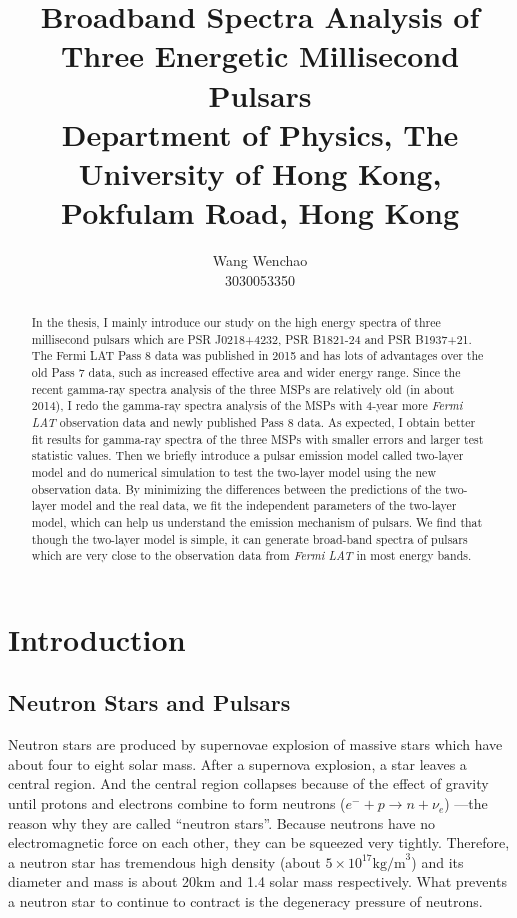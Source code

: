 \documentclass[12pt]{report}
\title{\textbf{Broadband Spectra Analysis of Three Energetic Millisecond Pulsars}\\ \vspace{1cm}
			{\large Department of Physics, The University of Hong Kong, Pokfulam Road, Hong Kong}\\ \vspace{1cm}
}
\date{}
\author{Wang Wenchao  \\3030053350}
\begin{document}
\maketitle
\tableofcontents{}
\begin{abstract}
    \normalsize
    In the thesis, I mainly introduce our study on the high energy spectra of three millisecond pulsars which are  
    PSR J0218+4232, PSR B1821-24 and PSR B1937+21. 
    The Fermi LAT Pass 8 data was published in 2015 and has lots of advantages over the old Pass 7 data, 
    such as increased effective area and wider energy range. Since the recent gamma-ray spectra analysis of 
    the three MSPs are relatively old (in about 2014), I redo the gamma-ray spectra analysis of the MSPs with 
    4-year more \textit{Fermi LAT} observation data and newly published Pass 8 data. 
    As expected, I obtain better fit results for gamma-ray spectra of 
    the three MSPs with smaller errors and larger test statistic values. Then we briefly introduce 
    a pulsar emission model called two-layer model \cite{0004-637X-787-2-167} and do numerical simulation 
    to test the two-layer model using the new observation data.
    By minimizing the differences between the predictions of the two-layer model and the real 
    data, we fit the independent parameters of the two-layer model, which can help us understand the 
    emission mechanism of pulsars. We find that though the two-layer model is simple, it can generate 
    broad-band spectra of pulsars which are very close to the observation data from \textit{Fermi LAT}
    in most energy bands.

\end{abstract}
			
\chapter{Introduction}   	   
    \section{Neutron Stars and Pulsars}
        Neutron stars are produced by supernovae explosion of massive stars which have about four to eight
        solar mass. After a supernova explosion, a star leaves a central region. And the central region collapses because 
        of the effect of 
        gravity until protons and electrons combine to form neutrons ($e^{-}+p\rightarrow n+\nu_{e}$)
        ---the reason why they are called 
        ``neutron stars''.  
        Because neutrons have no electromagnetic force on each other, they can be squeezed very tightly. 
        Therefore, a neutron  
        star has tremendous high density (about $5\times 10^{17} \mbox{kg/m}^3$) and its diameter and mass is about
        20km and 
        1.4 solar mass respectively. What
        prevents a neutron star to continue to contract is the degeneracy pressure of neutrons. 
        
\end{document}
